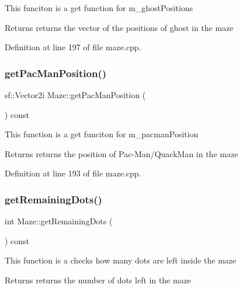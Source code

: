 This funciton is a get function for m\+\_\+ghost\+Positions

\begin{DoxyReturn}{Returns}
returns the vector of the positions of ghost in the maze 
\end{DoxyReturn}


Definition at line 197 of file maze.\+cpp.

\mbox{\label{class_maze_a663cb5481d68d68b8d0483d949a125d8}} 
\subsubsection{\texorpdfstring{get\+Pac\+Man\+Position()}{getPacManPosition()}}
{\footnotesize\ttfamily sf\+::\+Vector2i Maze\+::get\+Pac\+Man\+Position (\begin{DoxyParamCaption}{ }\end{DoxyParamCaption}) const}

This function is a get funciton for m\+\_\+pacman\+Position

\begin{DoxyReturn}{Returns}
returns the position of Pac-\/\+Man/\+Quack\+Man in the maze 
\end{DoxyReturn}


Definition at line 193 of file maze.\+cpp.

\mbox{\label{class_maze_afe0905b13aaefd6135346b3cda931556}} 
\subsubsection{\texorpdfstring{get\+Remaining\+Dots()}{getRemainingDots()}}
{\footnotesize\ttfamily int Maze\+::get\+Remaining\+Dots (\begin{DoxyParamCaption}{ }\end{DoxyParamCaption}) const}

This function is a checks how many dots are left inside the maze

\begin{DoxyReturn}{Returns}
returns the number of dots left in the maze 
\end{DoxyReturn}


